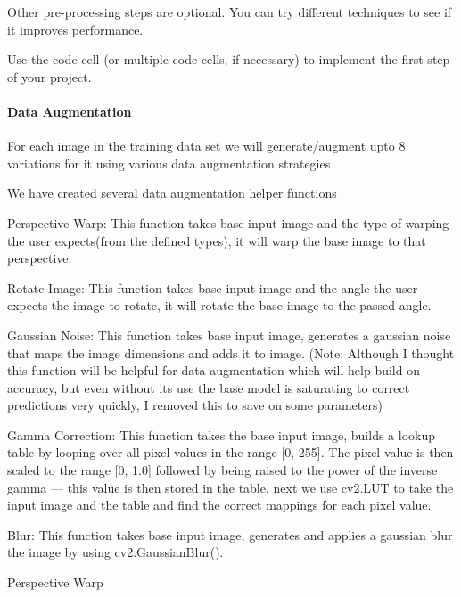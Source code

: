 \documentclass[11pt]{article}
\begin{document}
Other pre-processing steps are optional. You can try different
techniques to see if it improves performance.

Use the code cell (or multiple code cells, if necessary) to implement
the first step of your project.

    \paragraph{Data Augmentation}\label{data-augmentation}

    For each image in the training data set we will generate/augment upto 8
variations for it using various data augmentation strategies

We have created several data augmentation helper functions

Perspective Warp: This function takes base input image and the type of
warping the user expects(from the defined types), it will warp the base
image to that perspective.

Rotate Image: This function takes base input image and the angle the
user expects the image to rotate, it will rotate the base image to the
passed angle.

Gaussian Noise: This function takes base input image, generates a
gaussian noise that maps the image dimensions and adds it to image.
(Note: Although I thought this function will be helpful for data
augmentation which will help build on accuracy, but even without its use
the base model is saturating to correct predictions very quickly, I
removed this to save on some parameters)

Gamma Correction: This function takes the base input image, builds a
lookup table by looping over all pixel values in the range {[}0, 255{]}.
The pixel value is then scaled to the range {[}0, 1.0{]} followed by
being raised to the power of the inverse gamma --- this value is then
stored in the table, next we use cv2.LUT to take the input image and the
table and find the correct mappings for each pixel value.

Blur: This function takes base input image, generates and applies a
gaussian blur the image by using cv2.GaussianBlur().

    Perspective Warp
\end{document}
